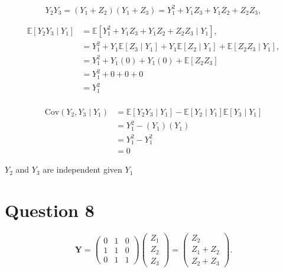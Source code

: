 \documentclass{article}
\begin{document}
\[Y_2 Y_3 
= (Y_1 + Z_2)(Y_1 + Z_3) = Y_1^2 + Y_1 Z_3 + Y_1 Z_2 + Z_2 Z_3, \]

\begin{align*}
\mathbb{E}[Y_2 Y_3 \mid Y_1] 
&= \mathbb{E}[Y_1^2 + Y_1 Z_3 + Y_1 Z_2 + Z_2 Z_3 \mid Y_1], \\
&= Y_1^2 + Y_1 \mathbb{E}[Z_3 \mid Y_1] + Y_1 \mathbb{E}[Z_2 \mid Y_1] + \mathbb{E}[Z_2 Z_3 \mid Y_1], \\
&= Y_1^2 + Y_1 (0) + Y_1 (0) + \mathbb{E}[Z_2 Z_3]\\
&= Y_1^2 + 0 + 0 + 0 \\
&= Y_1^2 \\
\end{align*}

\begin{align*}
\text{Cov}(Y_2, Y_3 \mid Y_1) 
&= \mathbb{E}[Y_2 Y_3 \mid Y_1] - \mathbb{E}[Y_2 \mid Y_1] \mathbb{E}[Y_3 \mid Y_1] \\
&= Y_1^2 - (Y_1)(Y_1)\\
&= Y_1^2 - Y_1^2 \\
&= 0
\end{align*}

$Y_2$  and  $Y_3$ are independent given $Y_1$

\section*{Question 8}
\[
\mathbf{Y} = 
\begin{pmatrix} 
0 & 1 & 0 \\ 
1 & 1 & 0 \\ 
0 & 1 & 1 
\end{pmatrix} 
\begin{pmatrix} 
Z_1 \\ 
Z_2 \\ 
Z_3 
\end{pmatrix} 
= 
\begin{pmatrix}
Z_2 \\
Z_1 + Z_2 \\
Z_2 + Z_3
\end{pmatrix}.
\]
\end{document}
